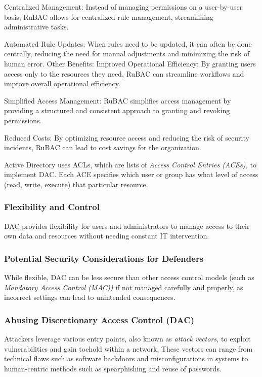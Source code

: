 Centralized Management:
Instead of managing permissions on a user-by-user basis, RuBAC allows for centralized rule management, streamlining administrative tasks.

Automated Rule Updates:
When rules need to be updated, it can often be done centrally, reducing the need for manual adjustments and minimizing the risk of human error. 
Other Benefits:
Improved Operational Efficiency:
By granting users access only to the resources they need, RuBAC can streamline workflows and improve overall operational efficiency. 

Simplified Access Management:
RuBAC simplifies access management by providing a structured and consistent approach to granting and revoking permissions. 

Reduced Costs:
By optimizing resource access and reducing the risk of security incidents, RuBAC can lead to cost savings for the organization.
 


Active Directory uses ACLs, which are lists of \textit{Access Control Entries (ACEs),} to implement DAC. Each ACE specifies which user or group has what level of access (read, write, execute) that particular resource.

\subsubsection{Flexibility and Control}
DAC provides flexibility for users and administrators to manage access to their own data and resources without needing constant IT intervention.

\subsubsection{Potential Security Considerations for Defenders}
While flexible, DAC can be less secure than other access control models (such as \textit{Mandatory Access Control (MAC))} if not managed carefully and properly, as incorrect settings can lead to unintended consequences.

\subsubsection{Abusing Discretionary Access Control (DAC)}
Attackers leverage various entry points, also known as \textit{attack vectors,} to exploit vulnerabilities and gain toehold within a network. These vectors can range from technical flaws such as software backdoors and misconfigurations in systems to human-centric methods such as spearphishing and reuse of passwords.

